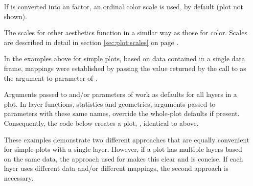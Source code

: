 \documentclass[krantz2]{krantz}\usepackage{knitr}
\begin{document}
If  is converted into an  factor, an ordinal color scale is used, by default  (plot not shown).

\begin{knitrout}\footnotesize
{}\color{fgcolor}\begin{kframe}
\begin{alltt}
\hlstd{(} 
        \hlstd{=} \hlstd{(}     \hlstd{=}  \hlopt{+}
  \hlstd{()}
\end{alltt}
\end{kframe}
\end{knitrout}

The scales for other aesthetics function in a similar way as those for color. Scales are described in detail in section \ref{sec:plot:scales} on page \pageref{sec:plot:scales:continuous}.

In the examples above for simple plots, based on data contained in a single data frame, mappings were established  by passing the value returned by the call to  as the argument to parameter  of .

Arguments passed to  and/or  parameters of  work as defaults for all layers in a plot. In layer functions, statistics and geometries, arguments passed to parameters with these same names, override the whole-plot defaults if present. Consequently, the code below creates a plot, , identical to  above.

\begin{knitrout}\footnotesize
{}\color{fgcolor}\begin{kframe}
\begin{alltt}
 \hlkwb{<-}
  \hlstd{()} \hlopt{+}
  \hlstd{(} 
              \hlstd{=} \hlstd{(}     
\end{alltt}
\end{kframe}
\end{knitrout}

These examples demonstrate two different approaches that are equally convenient for simple plots with a single layer. However, if a plot has multiple layers based on the same data, the approach used for   makes this clear and is concise. If each layer uses different data and/or different mappings, the second approach is necessary.
\end{document}
